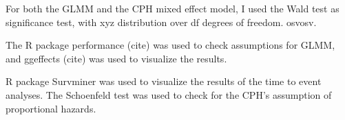 For both the GLMM and the CPH mixed effect model, I used the Wald test as significance test, with xyz distribution over df degrees of freedom. osvosv. 


The R package performance (cite) was used to check assumptions for GLMM, and ggeffects (cite) was used to visualize the results. 

R package Survminer was used to visualize the results of the time to event analyses.
The Schoenfeld test was used to check for the CPH's assumption of proportional hazards. 





%
%
%



